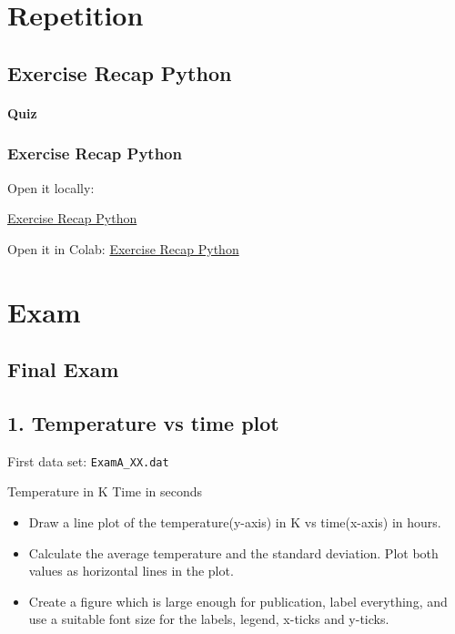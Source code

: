 \documentclass[
  letterpaper,
  DIV=11,
  numbers=noendperiod]{scrreprt}
\providecommand{\tightlist}{%
  \setlength{\itemsep}{0pt}\setlength{\parskip}{0pt}}\usepackage{longtable,booktabs,array}
\begin{document}
\part{Repetition}

\chapter{Exercise Recap Python}\label{exercise-recap-python}

\subsection{Quiz}\label{quiz-2}

\label{quiz-container}

\section*{Exercise Recap Python}\label{exercise-recap-python-1}


Open it locally:

\href{https://github.com/stkroe/PythonforChemists/blob/main/course/exercises/recap_python.ipynb}{Exercise
Recap Python}

Open it in Colab:
\href{https://colab.research.google.com/github/stkroe/PythonForChemists/blob/main/course/exercises/recap_python.ipynb}{Exercise
Recap Python}

\part{Exam}

\chapter{Final Exam}\label{final-exam}

\chapter{1. Temperature vs time plot}\label{temperature-vs-time-plot}

First data set: \texttt{ExamA\_XX.dat}

Temperature in K \textbar{} Time in seconds

\begin{itemize}
\tightlist
\item
  Draw a line plot of the temperature(y-axis) in K vs time(x-axis) in
  hours.
\item
  Calculate the average temperature and the standard deviation. Plot
  both values as horizontal lines in the plot.
\item
  Create a figure which is large enough for publication, label
  everything, and use a suitable font size for the labels, legend,
  x-ticks and y-ticks.
\end{itemize}
\end{document}

